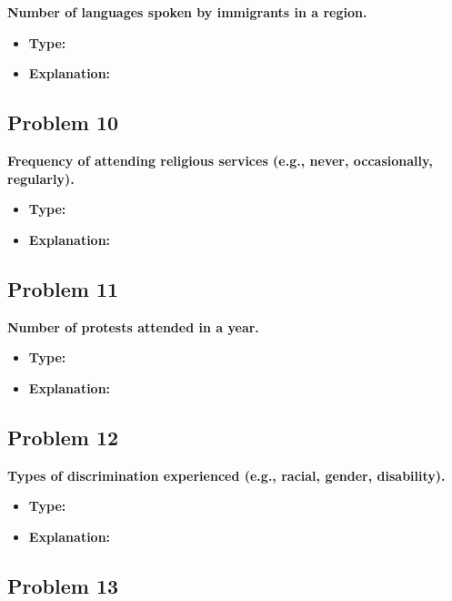 \documentclass[
  letterpaper,
  DIV=11,
  numbers=noendperiod]{scrreprt}
\begin{document}
\textbf{Number of languages spoken by immigrants in a region.}

\begin{itemize}
\item
  \textbf{Type:}
\item
  \textbf{Explanation:}
\end{itemize}

\subsection*{Problem 10}\label{problem-10}

\textbf{Frequency of attending religious services (e.g., never,
occasionally, regularly).}

\begin{itemize}
\item
  \textbf{Type:}
\item
  \textbf{Explanation:}
\end{itemize}

\subsection*{Problem 11}\label{problem-11}

\textbf{Number of protests attended in a year.}

\begin{itemize}
\item
  \textbf{Type:}
\item
  \textbf{Explanation:}
\end{itemize}

\subsection*{Problem 12}\label{problem-12}

\textbf{Types of discrimination experienced (e.g., racial, gender,
disability).}

\begin{itemize}
\item
  \textbf{Type:}
\item
  \textbf{Explanation:}
\end{itemize}

\subsection*{Problem 13}\label{problem-13}
\end{document}
